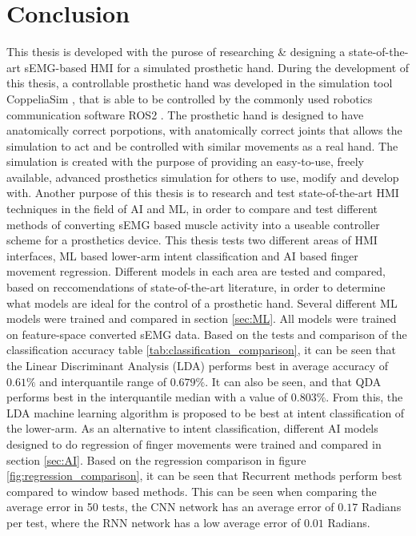 \documentclass[../main.tex]{subfiles}
\begin{document}
\section{Conclusion}

This thesis is developed with the purose of researching \& designing a state-of-the-art sEMG-based HMI for a simulated prosthetic hand.
During the development of this thesis, a controllable prosthetic hand was developed in the simulation tool CoppeliaSim \cite{coppeliasim}, that is able to be controlled by the commonly used robotics communication software ROS2 \cite{ros2}.
The prosthetic hand is designed to have anatomically correct porpotions, with anatomically correct joints that allows the simulation to act and be controlled with similar movements as a real hand. 
The simulation is created with the purpose of providing an easy-to-use, freely available, advanced prosthetics simulation for others to use, modify and develop with. 
Another purpose of this thesis is to research and test state-of-the-art HMI techniques in the field of AI and ML, in order to compare and test different methods of converting sEMG based muscle activity into a useable controller scheme for a prosthetics device.
This thesis tests two different areas of HMI interfaces, ML based lower-arm intent classification and AI based finger movement regression.
Different models in each area are tested and compared, based on reccomendations of state-of-the-art
literature, in order to determine what models are ideal for the control of a prosthetic hand.
Several different ML models were trained and compared in section \ref{sec:ML}.
All models were trained on feature-space converted sEMG data.
Based on the tests and comparison of the classification accuracy table \ref{tab:classification_comparison}, it can be seen that the Linear Discriminant Analysis (LDA) performs best in average accuracy of $0.61\%$ and interquantile range of $0.679\%$.
It can also be seen, and that QDA performs best in the interquantile median with a value of $0.803\%$.
From this, the LDA machine learning algorithm is proposed to be best at intent classification of the lower-arm.
As an alternative to intent classification, different AI models designed to do regression of finger movements were trained and compared in section \ref{sec:AI}.
Based on the regression comparison in figure \ref{fig:regression_comparison}, it can be seen that Recurrent methods perform best compared to window based methods.
This can be seen when comparing the average error in 50 tests, the CNN network has an average error of $0.17$ Radians per test, where the RNN network has a low average error of $0.01$ Radians.
\end{document}
